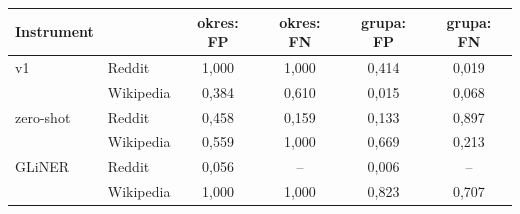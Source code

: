 \begin{tabular}{llcccc}
\toprule
Instrument &  & okres: FP & okres: FN & grupa: FP & grupa: FN \\
\midrule
v1 & Reddit & 1{,}000 & 1{,}000 & 0{,}414 & 0{,}019 \\
 & Wikipedia & 0{,}384 & 0{,}610 & 0{,}015 & 0{,}068 \\
\midrule
zero-shot & Reddit & 0{,}458 & 0{,}159 & 0{,}133 & 0{,}897 \\
 & Wikipedia & 0{,}559 & 1{,}000 & 0{,}669 & 0{,}213 \\
\midrule
GLiNER & Reddit & 0{,}056 & -- & 0{,}006 & -- \\
 & Wikipedia & 1{,}000 & 1{,}000 & 0{,}823 & 0{,}707 \\
\bottomrule
\end{tabular}
